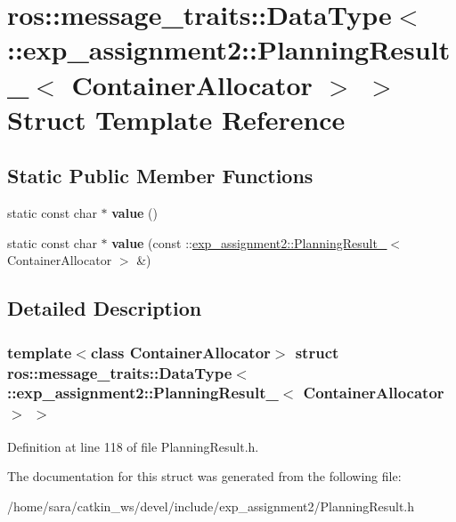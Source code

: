 \hypertarget{structros_1_1message__traits_1_1DataType_3_01_1_1exp__assignment2_1_1PlanningResult___3_01ContainerAllocator_01_4_01_4}{}\section{ros\+:\+:message\+\_\+traits\+:\+:Data\+Type$<$ \+:\+:exp\+\_\+assignment2\+:\+:Planning\+Result\+\_\+$<$ Container\+Allocator $>$ $>$ Struct Template Reference}
\label{structros_1_1message__traits_1_1DataType_3_01_1_1exp__assignment2_1_1PlanningResult___3_01ContainerAllocator_01_4_01_4}
\subsection*{Static Public Member Functions}
\begin{DoxyCompactItemize}
\item 
\mbox{\label{structros_1_1message__traits_1_1DataType_3_01_1_1exp__assignment2_1_1PlanningResult___3_01ContainerAllocator_01_4_01_4_a16743bd8ca151822731e8519863a0c40}} 
static const char $\ast$ {\bfseries value} ()
\item 
\mbox{\label{structros_1_1message__traits_1_1DataType_3_01_1_1exp__assignment2_1_1PlanningResult___3_01ContainerAllocator_01_4_01_4_ad2db3489a492629b72fca76fc9263f6a}} 
static const char $\ast$ {\bfseries value} (const \+::\hyperlink{structexp__assignment2_1_1PlanningResult__}{exp\+\_\+assignment2\+::\+Planning\+Result\+\_\+}$<$ Container\+Allocator $>$ \&)
\end{DoxyCompactItemize}


\subsection{Detailed Description}
\subsubsection*{template$<$class Container\+Allocator$>$\newline
struct ros\+::message\+\_\+traits\+::\+Data\+Type$<$ \+::exp\+\_\+assignment2\+::\+Planning\+Result\+\_\+$<$ Container\+Allocator $>$ $>$}



Definition at line 118 of file Planning\+Result.\+h.



The documentation for this struct was generated from the following file\+:\begin{DoxyCompactItemize}
\item 
/home/sara/catkin\+\_\+ws/devel/include/exp\+\_\+assignment2/Planning\+Result.\+h\end{DoxyCompactItemize}
